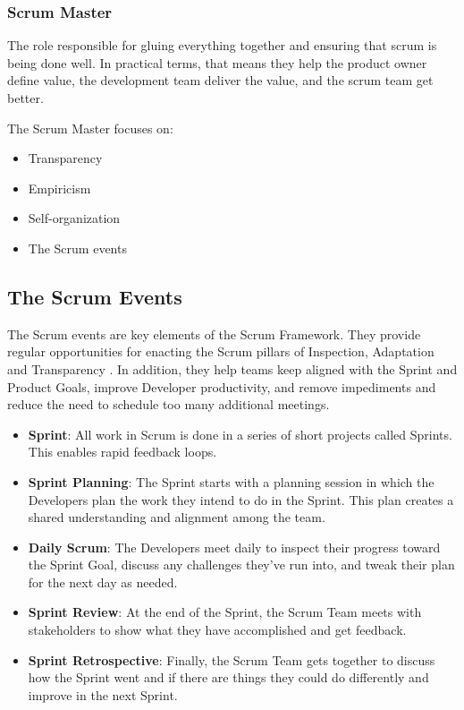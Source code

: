\subsubsection{Scrum Master}

The role responsible for gluing everything together and ensuring that scrum is being done well. In practical terms, that means they help the product owner define value, the development team deliver the value, and the scrum team get better.

The Scrum Master focuses on:
\begin{itemize}
    \item Transparency
    \item Empiricism
    \item Self-organization
    \item The Scrum events
\end{itemize}

\subsection{The Scrum Events}

The Scrum events are key elements of the Scrum Framework. They provide regular opportunities for enacting the Scrum pillars of Inspection, Adaptation and Transparency \cite{ScrumGuide2020}. In addition, they help teams keep aligned with the Sprint and Product Goals, improve Developer productivity, and remove impediments and reduce the need to schedule too many additional meetings.

\begin{itemize}
    \item \textbf{Sprint}: All work in Scrum is done in a series of short projects called Sprints. This enables rapid feedback loops.
    
    \item \textbf{Sprint Planning}: The Sprint starts with a planning session in which the Developers plan the work they intend to do in the Sprint. This plan creates a shared understanding and alignment among the team.
    
    \item \textbf{Daily Scrum}: The Developers meet daily to inspect their progress toward the Sprint Goal, discuss any challenges they've run into, and tweak their plan for the next day as needed.
    
    \item \textbf{Sprint Review}: At the end of the Sprint, the Scrum Team meets with stakeholders to show what they have accomplished and get feedback.
    
    \item \textbf{Sprint Retrospective}: Finally, the Scrum Team gets together to discuss how the Sprint went and if there are things they could do differently and improve in the next Sprint.
\end{itemize}

